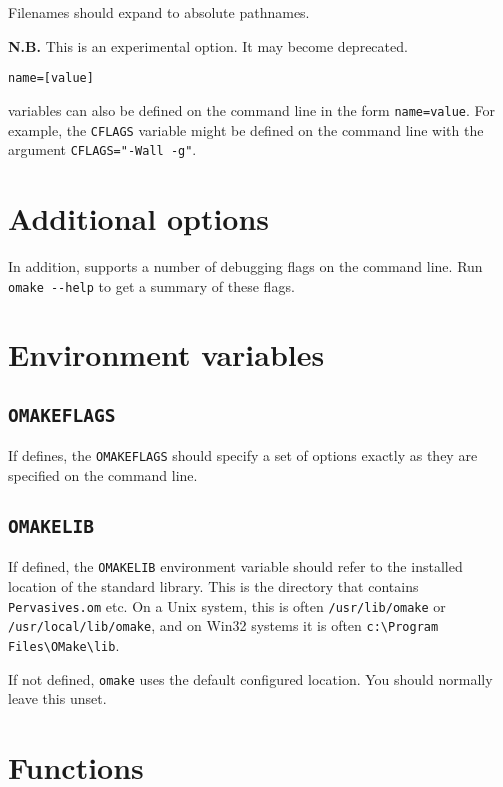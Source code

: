 Filenames should expand to absolute pathnames.

\textbf{N.B.} This is an experimental option. It may become deprecated.

 \verb+name=[value]+

 variables can also be defined on the command line in the form \verb+name=value+.  For
example, the \verb+CFLAGS+ variable might be defined on the command line with the argument
\verb+CFLAGS="-Wall -g"+.

\section{Additional options}

In addition,  supports a number of debugging flags on the command line. Run
\verb+omake --help+ to get a summary of these flags.

\section{Environment variables}

\subsection{\texttt{OMAKEFLAGS}}

If defines, the \verb+OMAKEFLAGS+ should specify a set of options exactly as they are specified on
the command line.

\subsection{\texttt{OMAKELIB}}

If defined, the \verb+OMAKELIB+ environment variable should refer to the installed location of the
\OMake{} standard library.  This is the directory that contains \verb+Pervasives.om+ etc.  On a Unix
system, this is often \verb+/usr/lib/omake+ or \verb+/usr/local/lib/omake+, and on Win32 systems it
is often \verb+c:\Program Files\OMake\lib+.

If not defined, \verb+omake+ uses the default configured location.  You should normally leave this
unset.

\section{Functions}

